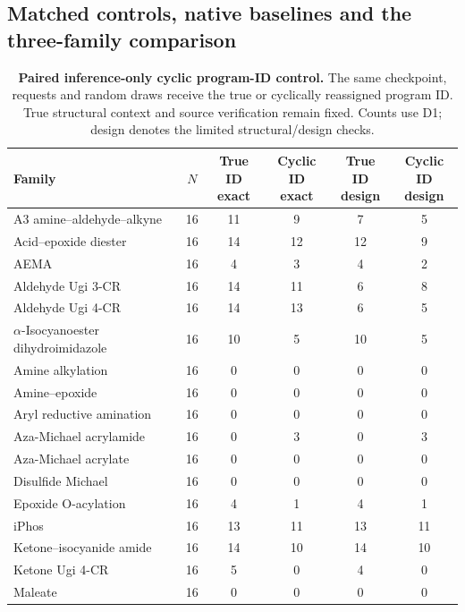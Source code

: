 \subsection{Matched controls, native baselines and the three-family comparison}
\begin{table}[H]
\caption{\textbf{Paired inference-only cyclic program-ID control.} The same checkpoint, requests and random draws receive the true or cyclically reassigned program ID. True structural context and source verification remain fixed. Counts use D1; design denotes the limited structural/design checks.}
\label{tab:22-controls}
\centering\footnotesize\setlength{\tabcolsep}{3pt}\renewcommand{\arraystretch}{1.10}
\begin{tabular}{@{}>{\raggedright\arraybackslash}p{}ccccc@{}}
\toprule
Family & $N$ & \shortstack{True ID\\exact} & \shortstack{Cyclic ID\\exact} & \shortstack{True ID\\design} & \shortstack{Cyclic ID\\design} \\
\midrule
A3 amine--aldehyde--alkyne & 16 & 11 & 9 & 7 & 5 \\
Acid--epoxide diester & 16 & 14 & 12 & 12 & 9 \\
AEMA & 16 & 4 & 3 & 4 & 2 \\
Aldehyde Ugi 3-CR & 16 & 14 & 11 & 6 & 8 \\
Aldehyde Ugi 4-CR & 16 & 14 & 13 & 6 & 5 \\
$\alpha$-Isocyanoester dihydroimidazole & 16 & 10 & 5 & 10 & 5 \\
Amine alkylation & 16 & 0 & 0 & 0 & 0 \\
Amine--epoxide & 16 & 0 & 0 & 0 & 0 \\
Aryl reductive amination & 16 & 0 & 0 & 0 & 0 \\
Aza-Michael acrylamide & 16 & 0 & 3 & 0 & 3 \\
Aza-Michael acrylate & 16 & 0 & 0 & 0 & 0 \\
Disulfide Michael & 16 & 0 & 0 & 0 & 0 \\
Epoxide O-acylation & 16 & 4 & 1 & 4 & 1 \\
iPhos & 16 & 13 & 11 & 13 & 11 \\
Ketone--isocyanide amide & 16 & 14 & 10 & 14 & 10 \\
Ketone Ugi 4-CR & 16 & 5 & 0 & 4 & 0 \\
Maleate & 16 & 0 & 0 & 0 & 0 \\

\end{tabular}
\end{table}
